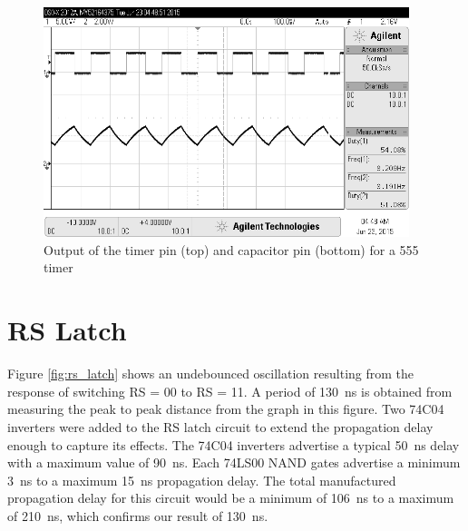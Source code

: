 \documentclass[11pt]{article}
\begin{document}
\begin{figure}[htpb]
	\centering
	\includegraphics[width=0.95\textwidth]{timer}
	\caption{Output of the timer pin (top) and capacitor pin (bottom) for a 555 timer}
	\label{fig:timer}
\end{figure}

\section{RS Latch}



Figure \ref{fig:rs_latch} shows an undebounced oscillation resulting from the response of switching RS = 00 to RS = 11. A period of \SI{130}{\nano\second} is obtained from measuring the peak to peak distance from the graph in this figure. Two 74C04 inverters were added to the RS latch circuit to extend the propagation delay enough to capture its effects. The 74C04 inverters advertise a typical \SI{50}{\nano\second} delay with a maximum value of \SI{90}{\nano\second}. Each 74LS00 NAND gates advertise a minimum \SI{3}{\nano\second} to a maximum \SI{15}{\nano\second} propagation delay. The total manufactured propagation delay for this circuit would be a minimum of \SI{106}{\nano\second} to a maximum of \SI{210}{\nano\second}, which confirms our result of \SI{130}{\nano\second}.
\end{document}
